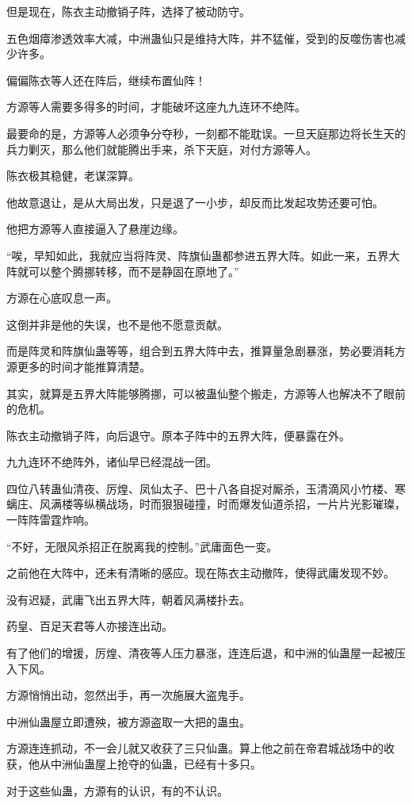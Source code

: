 \begin{this_body}
但是现在，陈衣主动撤销子阵，选择了被动防守。

五色烟瘴渗透效率大减，中洲蛊仙只是维持大阵，并不猛催，受到的反噬伤害也减少许多。

偏偏陈衣等人还在阵后，继续布置仙阵！

方源等人需要多得多的时间，才能破坏这座九九连环不绝阵。

最要命的是，方源等人必须争分夺秒，一刻都不能耽误。一旦天庭那边将长生天的兵力剿灭，那么他们就能腾出手来，杀下天庭，对付方源等人。

陈衣极其稳健，老谋深算。

他故意退让，是从大局出发，只是退了一小步，却反而比发起攻势还要可怕。

他把方源等人直接逼入了悬崖边缘。

“唉，早知如此，我就应当将阵灵、阵旗仙蛊都参进五界大阵。如此一来，五界大阵就可以整个腾挪转移，而不是静固在原地了。”

方源在心底叹息一声。

这倒并非是他的失误，也不是他不愿意贡献。

而是阵灵和阵旗仙蛊等等，组合到五界大阵中去，推算量急剧暴涨，势必要消耗方源更多的时间才能推算清楚。

其实，就算是五界大阵能够腾挪，可以被蛊仙整个搬走，方源等人也解决不了眼前的危机。

陈衣主动撤销子阵，向后退守。原本子阵中的五界大阵，便暴露在外。

九九连环不绝阵外，诸仙早已经混战一团。

四位八转蛊仙清夜、厉煌、凤仙太子、巴十八各自捉对厮杀，玉清滴风小竹楼、寒螭庄、风满楼等纵横战场，时而狠狠碰撞，时而爆发仙道杀招，一片片光影璀璨，一阵阵雷霆炸响。

“不好，无限风杀招正在脱离我的控制。”武庸面色一变。

之前他在大阵中，还未有清晰的感应。现在陈衣主动撤阵，使得武庸发现不妙。

没有迟疑，武庸飞出五界大阵，朝着风满楼扑去。

药皇、百足天君等人亦接连出动。

有了他们的增援，厉煌、清夜等人压力暴涨，连连后退，和中洲的仙蛊屋一起被压入下风。

方源悄悄出动，忽然出手，再一次施展大盗鬼手。

中洲仙蛊屋立即遭殃，被方源盗取一大把的蛊虫。

方源连连抓动，不一会儿就又收获了三只仙蛊。算上他之前在帝君城战场中的收获，他从中洲仙蛊屋上抢夺的仙蛊，已经有十多只。

对于这些仙蛊，方源有的认识，有的不认识。


\end{this_body}
